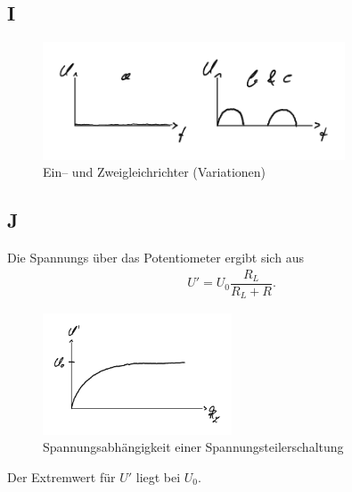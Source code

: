 \documentclass[a4paper,10pt]{article}
\numberwithin{equation}{section}
\begin{document}
\subsection{I}
\begin{figure}[h]
	\centering
	\includegraphics[width=0.8\textwidth]{I_crop.pdf}
	\caption[Ein-- und Zweigleichrichter (Variationen)]{Ein-- und Zweigleichrichter (Variationen)}
\end{figure}

\subsection{J}
Die Spannungs über das Potentiometer ergibt sich aus
\begin{align}
	U'=U_0\dfrac{R_L}{R_L+R}\label{eq:U'}
	.\end{align}
\begin{figure}[h]
	\centering
	\includegraphics[width=0.5\textwidth]{J_crop.pdf}
	\caption[Spannungsabhängigkeit einer Spannungsteilerschaltung]{Spannungsabhängigkeit einer Spannungsteilerschaltung}
\end{figure}
Der Extremwert für $U'$ liegt bei $U_0$.
\end{document}
